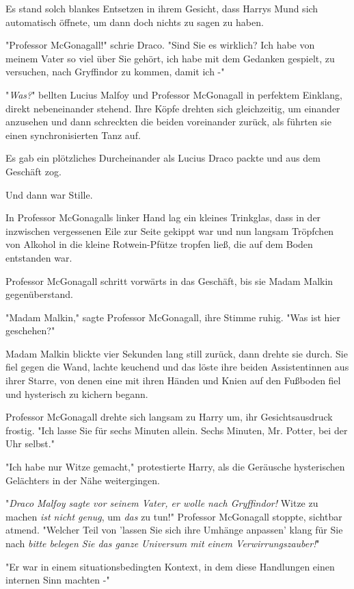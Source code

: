 {Es stand solch blankes Entsetzen in ihrem Gesicht, dass Harrys Mund sich automatisch öffnete, um dann doch nichts zu sagen zu haben.

"Professor McGonagall!" schrie Draco. "Sind Sie es wirklich? Ich habe von meinem Vater so viel über Sie gehört, ich habe mit dem Gedanken gespielt, zu versuchen, nach Gryffindor zu kommen, damit ich -"

"\emph{Was?}" bellten Lucius Malfoy und Professor McGonagall in perfektem Einklang, direkt nebeneinander stehend. Ihre Köpfe drehten sich gleichzeitig, um einander anzusehen und dann schreckten die beiden voreinander zurück, als führten sie einen synchronisierten Tanz auf.

Es gab ein plötzliches Durcheinander als Lucius Draco packte und aus dem Geschäft zog.

Und dann war Stille.

In Professor McGonagalls linker Hand lag ein kleines Trinkglas, dass in der inzwischen vergessenen Eile zur Seite gekippt war und nun langsam Tröpfchen von Alkohol in die kleine Rotwein-Pfütze tropfen ließ, die auf dem Boden entstanden war.

Professor McGonagall schritt vorwärts in das Geschäft, bis sie Madam Malkin gegenüberstand.

"Madam Malkin," sagte Professor McGonagall, ihre Stimme ruhig. "Was ist hier geschehen?"

Madam Malkin blickte vier Sekunden lang still zurück, dann drehte sie durch. Sie fiel gegen die Wand, lachte keuchend und das löste ihre beiden Assistentinnen aus ihrer Starre, von denen eine mit ihren Händen und Knien auf den Fußboden fiel und hysterisch zu kichern begann.

Professor McGonagall drehte sich langsam zu Harry um, ihr Gesichtsausdruck frostig. "Ich lasse Sie für sechs Minuten allein. Sechs Minuten, Mr. Potter, bei der Uhr selbst."

"Ich habe nur Witze gemacht," protestierte Harry, als die Geräusche hysterischen Gelächters in der Nähe weitergingen.

"\emph{Draco Malfoy sagte vor seinem Vater, er wolle nach Gryffindor!} Witze zu machen \emph{ist nicht genug}, um \emph{das} zu tun!" Professor McGonagall stoppte, sichtbar atmend. "Welcher Teil von 'lassen Sie sich ihre Umhänge anpassen' klang für Sie nach \emph{bitte belegen Sie das ganze Universum mit einem Verwirrungszauber!}"

"Er war in einem situationsbedingten Kontext, in dem diese Handlungen einen internen Sinn machten -"

}
